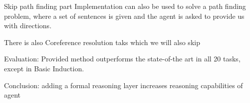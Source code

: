 Skip path finding part
    Implementation can also be used to solve a path finding problem, where a set of sentences is given and the agent is asked to provide us with directions.
    
There is also Coreference resolution taks which we will also skip


Evaluation: Provided method outperforms the state-of-the art in all 20 tasks, except in Basic Induction. 


Conclusion: 
    adding a formal reasoning layer increases reasoning capabilities of agent





